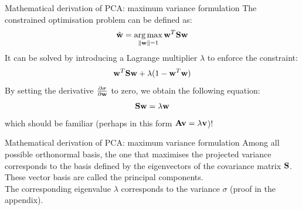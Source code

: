 \documentclass[aspectratio=169,notes]{beamer}
\begin{document}
	\begin{frame}{Mathematical derivation of PCA: maximum variance formulation}
	The constrained optimisation problem can be defined as:
	\[
		\hat{{\bf w}} = \operatorname*{arg\,max}_{\|{\bf w}\|=1} {\bf w}^T {\bf S} {\bf w}
	\]
	It can be solved by introducing a Lagrange multiplier $\lambda$ to enforce the constraint:
	\[
		{\bf w}^T {\bf S} {\bf w} + \lambda (1-{\bf w}^T{\bf w})
	\]
	By setting the derivative $\frac{\partial \sigma}{\partial {\bf w}}$ to zero, we obtain the following equation:
	\[
		{\bf S} {\bf w} = \lambda {\bf w}
	\]
	which should be familiar (perhaps in this form ${\bf A} {\bf v} = \lambda {\bf v}$)!
	\end{frame}

	\begin{frame}{Mathematical derivation of PCA: maximum variance formulation}
	Among all possible orthonormal basis, the one that maximises the projected variance corresponds to the basis defined by the eigenvectors of the covariance matrix ${\bf S}$. These vector basis are called the principal components.\\
	\leavevmode\newline
	The corresponding eigenvalue $\lambda$ corresponds to the variance $\sigma$ (proof in the appendix).
	\end{frame}


\end{document}
